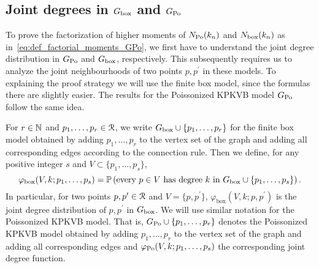 \subsection{Joint degrees in $G_{\mathrm{box}}$ and $G_{{\mathrm{Po}}}$}\label{ssec:joint_degrees_GPo}

To prove the factorization of higher moments of $N_{{\mathrm{Po}}}(k_n)$ and $N_{\text{box}}(k_n)$ as in~\eqref{eq:def_factorial_moments_GPo}, we first have to understand the joint degree distribution in $G_{{\mathrm{Po}}}$ and $G_{\mathrm{box}}$, respectively. This subsequently requires us to analyze the joint neighbourhoods of two points $p, p^\prime$ in these models. To explaining the proof strategy we will use the finite box model, since the formulas there are slightly easier. The results for the Poissonized KPKVB model $G_{{\mathrm{Po}}}$ follow the same idea.

%
%

For $r\in \mathbb{N}$ and $p_1, \dots, p_r \in {\mathcal R}$, we write $G_{\mathrm{box}}\cup \{p_1,\dots,p_r\}$ for the finite box model obtained by adding $p_1,\dots,p_r$ to the vertex set of the graph and adding all corresponding edges according to the connection rule. Then we define, for any positive integer $s$ and $V \subset \{p_1,\dots,p_s\}$,
\begin{equation}\label{eq:def_joint_degree_distribution}
\varphi_{\mathrm{box}}(V, k ; p_1,\dots,p_s) = \mathbb{P}\left(\text{every }p\in V\text{ has degree }k\text{ in }G_{\mathrm{box}} \cup \{p_1,\dots,p_s\}\right).
\end{equation}
In particular, for two points $p, p^\prime \in {\mathcal R}$ and $V = \{p,p^\prime\}$, $\varphi_{\mathrm{box}}(V, k ;p,p^\prime)$ is the joint degree distribution of $p, p^\prime $ in $G_{\mathrm{box}}$. We will use similar notation for the Poissonized KPKVB model. That is, $G_{{\mathrm{Po}}} \cup \{p_1,\dots,p_r\}$ denotes the Poissonized KPKVB model obtained by adding $p_1,\dots,p_r$ to the vertex set of the graph and adding all corresponding edges and $\varphi_{{\mathrm{Po}}}(V, k ; p_1,\dots,p_s)$ the corresponding joint degree function.

